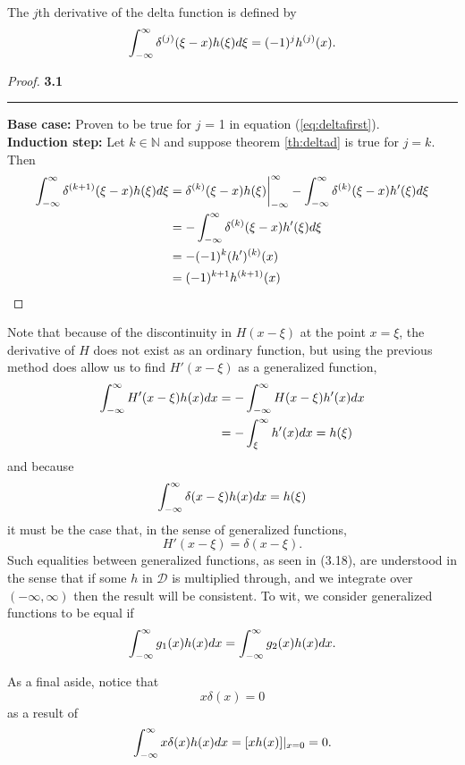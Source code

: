 \begin{theorem} \label{th:deltad}
    The \(j\)th derivative of the delta function is defined by
    \begin{equation}
         \int_{-\infty}^{\infty} \delta^{(j)}(\xi-x)h(\xi)d\xi = (-1)^jh^{(j)}(x).
    \end{equation}
\end{theorem}
\begin{proof} 
    \textbf{3.1}\\
    \noindent\rule{\textwidth}{1pt}
    \textbf{Base case:} Proven to be true for \(j\) = 1 in equation (\ref{eq:deltafirst}).\\
    \textbf{Induction step:} Let \(k \in \mathbb{N}\) and suppose theorem \ref{th:deltad} is true for \(j=k\). Then
    \begin{align*}
        \int_{-\infty}^{\infty} \delta^{(k+1)}(\xi-x)h(\xi)d\xi &= \delta^{(k)}(\xi-x)h(\xi)\biggr\rvert_{-\infty}^{\infty}-\int_{-\infty}^{\infty} \delta^{(k)}(\xi-x)h'(\xi)d\xi\\
        &=-\int_{-\infty}^{\infty} \delta^{(k)}(\xi-x)h'(\xi)d\xi\\
        &=-(-1)^{k}(h')^{(k)}(x)\\
        &=(-1)^{k+1}h^{(k+1)}(x)
    \end{align*}
\end{proof}

Note that because of the discontinuity in \(H(x-\xi)\) at the point \(x=\xi\), the derivative of \(H\) does not exist as an ordinary function, but using the previous method does allow us to find \(H'(x-\xi)\) as a generalized function, 
\begin{equation}
    \begin{split}
        \int_{-\infty}^{\infty} H'(x-\xi)h(x)dx &= -\int_{-\infty}^{\infty} H(x-\xi)h'(x)dx\\
        &=-\int_{\xi}^{\infty}h'(x)dx = h(\xi)
    \end{split}
\end{equation}
and because
\begin{equation}
    \int_{-\infty}^{\infty} \delta(x-\xi)h(x)dx=h(\xi)
\end{equation}
it must be the case that, in the sense of generalized functions,
\begin{equation}
    H'(x-\xi) = \delta(x-\xi).
\end{equation}
Such equalities between generalized functions, as seen in (3.18), are understood in the sense that if some \(h\) in \(\mathcal{D}\) is multiplied through, and we integrate over \((-\infty, \infty)\) then the result will be consistent. To wit, we consider generalized functions to be equal if
\begin{equation}
    \int_{-\infty}^{\infty} g_1(x)h(x)dx = \int_{-\infty}^{\infty} g_2(x)h(x)dx.
\end{equation}

As a final aside, notice that
\begin{equation}
    x\delta(x)=0
\end{equation}
as a result of
\begin{equation}
    \int_{-\infty}^{\infty} x\delta(x)h(x)dx=[xh(x)]|_{x=0} = 0.
\end{equation}